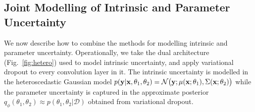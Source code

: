 % 
%
%
%
\subsection{Joint Modelling of Intrinsic and Parameter Uncertainty}
We now describe how to combine the methods for modelling intrinsic and parameter uncertainty. Operationally, we take the dual architecture (Fig.~\ref{fig:hetero}) used to model intrinsic uncertainty, and apply variational dropout to every convolution layer in it. The intrinsic uncertainty is modelled in the heteroscedastic Gaussian model $p(\mathbf{y}|\mathbf{x}, \theta_1, \theta_2) = \mathcal{N}\big{(}\mathbf{y}; \mu(\mathbf{x};\theta_1),\Sigma(\mathbf{x};\theta_2)\big{)}$ while the parameter uncertainty is captured in the approximate posterior $q_{\phi}(\theta_1, \theta_2) \approx p(\theta_1, \theta_2|\mathcal{D}) $ obtained from variational dropout. 

